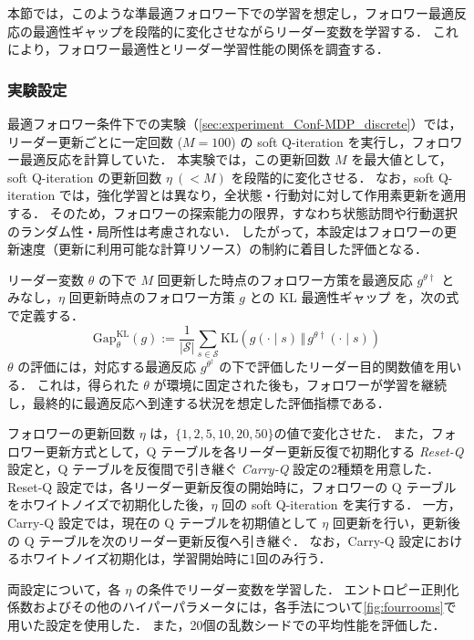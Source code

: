 \documentclass[originalpaper,fleqn]{jsaiart}     %
\begin{document}
本節では，このような準最適フォロワー下での学習を想定し，フォロワー最適反応の最適性ギャップを段階的に変化させながらリーダー変数を学習する．
これにより，フォロワー最適性とリーダー学習性能の関係を調査する．

\subsubsection{実験設定}

最適フォロワー条件下での実験（\ref{sec:experiment_Conf-MDP_discrete}）では，リーダー更新ごとに一定回数 ($M=100$) の soft Q-iteration を実行し，フォロワー最適反応を計算していた．
本実験では，この更新回数 $M$ を最大値として，soft Q-iteration の更新回数 $\eta~(< M)$ を段階的に変化させる．
なお，soft Q-iteration では，強化学習とは異なり，全状態・行動対に対して作用素更新を適用する．
そのため，フォロワーの探索能力の限界，すなわち状態訪問や行動選択のランダム性・局所性は考慮されない．
したがって，本設定はフォロワーの更新速度（更新に利用可能な計算リソース）の制約に着目した評価となる．

リーダー変数 $\theta$ の下で $M$ 回更新した時点のフォロワー方策を最適反応 $g^{\theta\dagger}$ とみなし，$\eta$ 回更新時点のフォロワー方策 $g$ との KL 最適性ギャップ
を，次の式で定義する．
\begin{equation*}
    \mathrm{Gap}_{\theta}^{\mathrm{KL}}(g)
    :=
    \dfrac{1}{|\mathcal{S}|}
    \sum_{s\in\mathcal{S}}
    \mathrm{KL}\!\left(
        g(\cdot\mid s)
        \,\Vert\,
        g^{\theta\dag}(\cdot\mid s)
    \right)
\end{equation*}
$\theta$ の評価には，対応する最適反応 $g^{\theta^\dagger}$ の下で評価したリーダー目的関数値を用いる．
これは，得られた $\theta$ が環境に固定された後も，フォロワーが学習を継続し，最終的に最適反応へ到達する状況を想定した評価指標である．

フォロワーの更新回数 $\eta$ は，$\{1,2,5,10,20,50\}$の値で変化させた．
また，フォロワー更新方式として，Q テーブルを各リーダー更新反復で初期化する \emph{Reset-Q} 設定と，Q テーブルを反復間で引き継ぐ \emph{Carry-Q} 設定の2種類を用意した．
Reset-Q 設定では，各リーダー更新反復の開始時に，フォロワーの Q テーブルをホワイトノイズで初期化した後，$\eta$ 回の soft Q-iteration を実行する．
一方，Carry-Q 設定では，現在の Q テーブルを初期値として $\eta$ 回更新を行い，更新後の Q テーブルを次のリーダー更新反復へ引き継ぐ．
なお，Carry-Q 設定におけるホワイトノイズ初期化は，学習開始時に1回のみ行う．

両設定について，各 $\eta$ の条件でリーダー変数を学習した．
エントロピー正則化係数およびその他のハイパーパラメータには，各手法について\ref{fig:fourrooms}で用いた設定を使用した．
また，20個の乱数シードでの平均性能を評価した．
\end{document}
